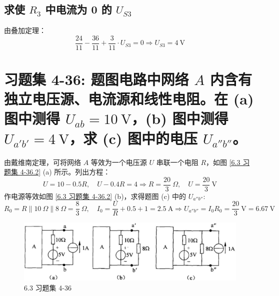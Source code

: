 \documentclass[UTF8]{report}
\theoremstyle{MyLineTheoremStyle} %
\theoremstyle{MyBlockTheoremStyle} %
\theoremstyle{MySubsubsectionStyle} %
\begin{document}
\subsection{求使 $R_3$ 中电流为 0 的 $U_{S3}$}

由叠加定理：
\begin{equation}
\boxed{
    \frac{24}{11} - \frac{36}{11} + \frac{3}{11} \cdot U_{S3} = 0 \Longrightarrow U_{S3} = 4 \ \mathrm{V}
}
\end{equation}

\section{习题集 4-36: 题图电路中网络 $A$ 内含有独立电压源、电流源和线性电阻。在 (a) 图中测得 $U_{ab} = 10 \ \mathrm{V}$，(b) 图中测得 $U_{a'b'} = 4 \ \mathrm{V}$，求 (c) 图中的电压 $U_{a''b''}$。}

由戴维南定理，可将网络 $A$ 等效为一个电压源 $U$ 串联一个电阻 $R$，如图 \ref{6.3 习题集 4-36.2} (a) 所示。列出方程：
\begin{equation}
U = 10 - 0.5 R,\quad U - 0.4 R = 4 \Longrightarrow R = \frac{20}{3} \ \Omega,\quad U = \frac{20}{3} \ \mathrm{V}
\end{equation}
作电源等效如图 \ref{6.3 习题集 4-36.2} (b)，求得题图 (c) 中的 $U_{a''b''}$:
\begin{equation}
R_0 = R \parallel 10 \ \Omega \parallel 8 \ \Omega = \frac{8}{3} \ \Omega,\quad I_0 = \frac{U}{R} + 0.5 + 1 = 2.5 \ \mathrm{A} \Longrightarrow 
\boxed{
    U_{a''b''} =  I_0R_0 = \frac{20}{3} \ \mathrm{V} = 6.67 \ \mathrm{V}
}
\end{equation}

\begin{figure}[H]\centering
\includegraphics[width=0.85\columnwidth]{assets/6/image (7).jpg}
\caption{ 6.3 习题集 4-36}\label{6.3 习题集 4-36}
\end{figure}
\end{document}
